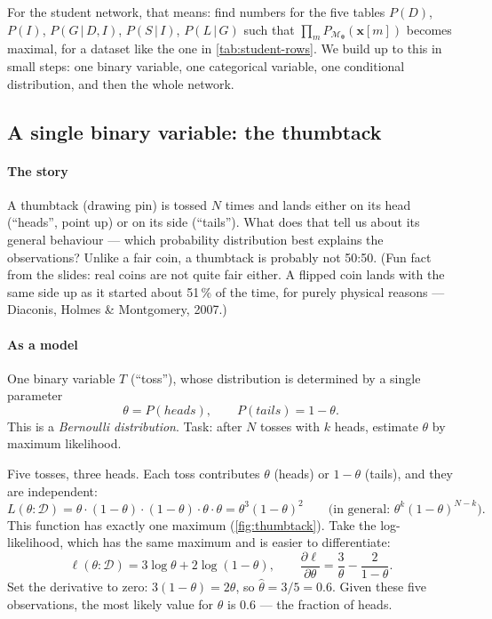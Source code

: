 \documentclass[11pt, oneside]{book}
\newcommand{\Prob}{\mathbb{P}}           %
\newcommand{\dataset}{\mathcal{D}}       %
\newcommand{\params}{\boldsymbol{\theta}}   %
\newcommand{\given}{\,\vert\,}           %
\newcommand{\bx}{\mathbf{x}}  \newcommand{\by}{\mathbf{y}}
\newcommand{\vn}[1]{\mathit{#1}}         %
\let\originalsubsection\subsection
\renewcommand{\subsection}{\Needspace{6\baselineskip}\originalsubsection}
\begin{document}
For the student network, that means: find numbers for the five tables $P(D)$,
$P(I)$, $P(G \given D, I)$, $P(S \given I)$, $P(L \given G)$ such that
$\prod_m P_{\mathcal{M}_{\params}}(\bx[m])$ becomes maximal, for a dataset like
the one in \cref{tab:student-rows}. We build up to this in small steps: one
binary variable, one categorical variable, one conditional distribution,
and then the whole network.

\subsection{A single binary variable: the thumbtack}
\label{sec:thumbtack}

\paragraph{The story} A thumbtack (drawing pin) is tossed $N$ times and lands
either on its head (``heads'', point up) or on its side (``tails''). What does
that tell us about its general behaviour --- which probability distribution
best explains the observations? Unlike a fair coin, a thumbtack is probably not
50:50. (Fun fact from the slides: real coins are not quite fair either. A
flipped coin lands with the same side up as it started about 51\,\% of the
time, for purely physical reasons --- Diaconis, Holmes \& Montgomery, 2007.)

\paragraph{As a model} One binary variable $T$ (``toss''), whose distribution
is determined by a single parameter
\[
\theta = P(\vn{heads}), \qquad P(\vn{tails}) = 1 - \theta .
\]
This is a \emph{Bernoulli distribution}. Task: after $N$ tosses with $k$
heads, estimate $\theta$ by maximum likelihood.

\begin{exbox}[title={ML estimate for $\dataset = \{h, t, t, h, h\}$}]
Five tosses, three heads. Each toss contributes $\theta$ (heads) or
$1 - \theta$ (tails), and they are independent:
\[
L(\theta : \dataset) = \theta \cdot (1-\theta) \cdot (1-\theta) \cdot \theta \cdot \theta
= \theta^3 (1-\theta)^2 \qquad \big(\text{in general: } \theta^k (1-\theta)^{N-k}\big).
\]
This function has exactly one maximum (\cref{fig:thumbtack}). Take the
log-likelihood, which has the same maximum and is easier to differentiate:
\[
\ell(\theta : \dataset) = 3 \log\theta + 2 \log(1-\theta), \qquad
\frac{\partial \ell}{\partial \theta} = \frac{3}{\theta} - \frac{2}{1-\theta}.
\]
Set the derivative to zero: $3(1-\theta) = 2\theta$, so $\hat\theta = 3/5 =
0.6$. Given these five observations, the most likely value for $\theta$ is
$0.6$ --- the fraction of heads.
\end{exbox}
\end{document}
